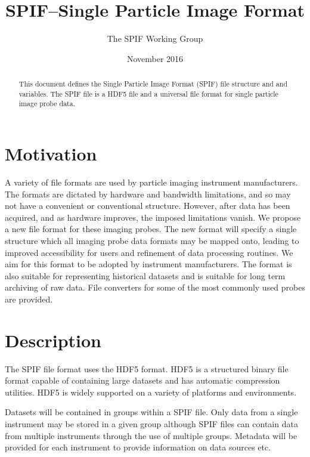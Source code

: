 \documentclass[12pt,a4paper]{article}
\begin{document}
\title{SPIF--Single Particle Image Format}
\author{The SPIF Working Group}
\date{November 2016}

\maketitle
\begin{abstract}
This document defines the Single Particle Image Format (SPIF) file structure and and variables. The SPIF file is a HDF5 file and a universal file format for single particle image probe data.
\end{abstract}
\tableofcontents


\section{Motivation}
A variety of file formats are used by particle imaging instrument manufacturers. The formats are dictated by hardware and bandwidth limitations, and so may not have a convenient or conventional structure. However, after data has been acquired, and as hardware improves, the imposed limitations vanish. We propose a new file format for these imaging probes. The new format will specify a single structure which all imaging probe data formats may be mapped onto, leading to improved accessibility for users and refinement of data processing routines. We aim for this format to be adopted by instrument manufacturers. The format is also suitable for representing historical datasets and is suitable for long term archiving of raw data. File converters for some of the most commonly used probes are provided.


\section{Description}
The SPIF file format uses the HDF5 format. HDF5 is a structured binary file format capable of containing large datasets and has automatic compression utilities. HDF5 is widely supported on a variety of platforms and environments. 
\par
Datasets will be contained in groups within a SPIF file. Only data from a single instrument may be stored in a given group although SPIF files can contain data from multiple instruments through the use of multiple groups.
Metadata will be provided for each instrument to provide information on data sources etc.
\end{document}
